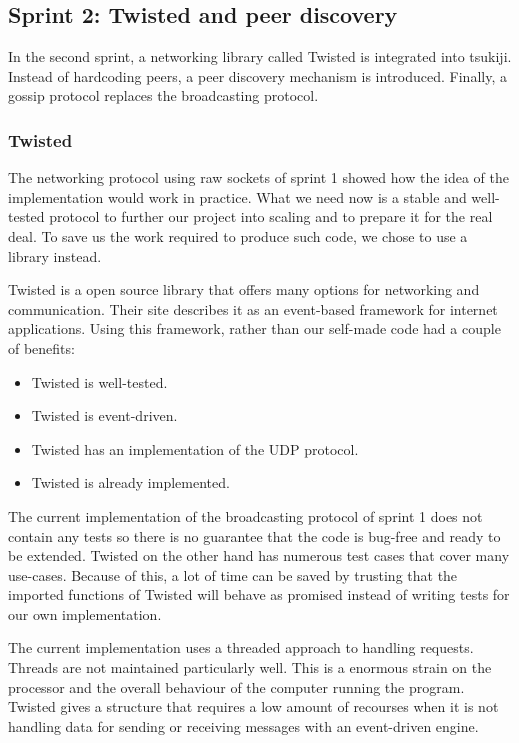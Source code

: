 \subsection{Sprint 2: Twisted and peer discovery}
In the second sprint, a networking library called Twisted is integrated into tsukiji. Instead of hardcoding peers, a peer discovery mechanism is introduced. Finally, a gossip protocol replaces the broadcasting protocol.

\subsubsection{Twisted}
\label{sprint2:twisted}
The networking protocol using raw sockets of sprint 1 showed how the idea of the implementation would work in practice.
What we need now is a stable and well-tested protocol to further our project into scaling and to prepare it for the real deal.
To save us the work required to produce such code, we chose to use a library instead.

Twisted is a open source library that offers many options for networking and communication. 
Their site describes it as an event-based framework for internet applications. Using this framework, rather than our self-made code had a couple of benefits:
\begin{itemize}
\item Twisted is well-tested.
\item Twisted is event-driven.
\item Twisted has an implementation of the UDP protocol.
\item Twisted is already implemented.
\end{itemize}
The current implementation of the broadcasting protocol of sprint 1 does not contain any tests so there is no guarantee that the code is bug-free and ready to be extended.
Twisted on the other hand has numerous test cases that cover many use-cases.
Because of this, a lot of time can be saved by trusting that the imported functions of Twisted will behave as promised instead of writing tests for our own implementation.

The current implementation uses a threaded approach to handling requests.
Threads are not maintained particularly well.
This is a enormous strain on the processor and the overall behaviour of the computer running the program.
Twisted gives a structure that requires a low amount of recourses when it is not handling data for sending or receiving messages with an event-driven engine.

